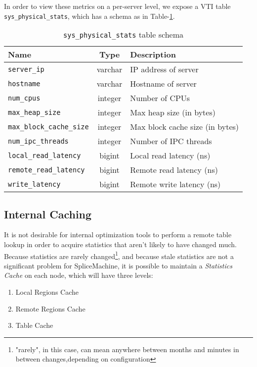 In order to view these metrics on a per-server level, we expose a VTI table \texttt{sys\_physical\_stats}, which has a schema as in Table-\ref{table:physicalStats}.

\begin{table}
				\begin{tabular}{|l|c|p{6cm}|}
								\hline
								\bf{Name}													& \bf{Type}	&	\bf{Description} \\ \hline	
								\texttt{server\_ip}								&	varchar		&	IP address of server \\ \hline
								\texttt{hostname}									&	varchar		&	Hostname of server \\ \hline
								\texttt{num\_cpus}								&	integer		& Number of CPUs \\ \hline
								\texttt{max\_heap\_size}					&	integer		&	Max heap size (in bytes)\\ \hline
								\texttt{max\_block\_cache\_size}	&	integer		&	Max block cache size (in bytes) \\ \hline
								\texttt{num\_ipc\_threads}				&	integer		&	Number of IPC threads \\ \hline
								\texttt{local\_read\_latency}			&	bigint		&	Local read latency (ns) \\ \hline
								\texttt{remote\_read\_latency}		&	bigint		& Remote read latency (ns) \\ \hline
								\texttt{write\_latency}						&	bigint		&	Remote write latency (ns) \\ \hline
				\end{tabular}
				\caption{\texttt{sys\_physical\_stats} table schema}
				\label{table:physicalStats}
\end{table}

\subsection{Internal Caching}
It is not desirable for internal optimization tools to perform a remote table lookup in order to acquire statistics that aren't likely to have changed much. Because statistics are rarely changed\footnote{"rarely", in this case, can mean anywhere between months and minutes in between changes,depending on configuration}, and because stale statistics are not a significant problem for SpliceMachine, it is possible to maintain a \emph{Statistics Cache} on each node, which will have three levels:

\begin{enumerate}
				\item Local Regions Cache
				\item Remote Regions Cache
				\item Table Cache
\end{enumerate}

